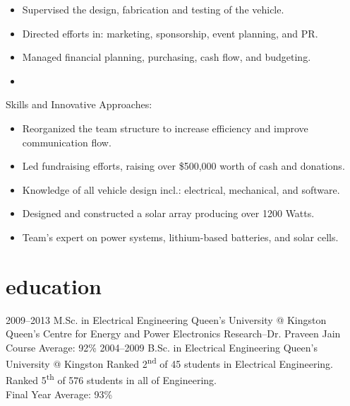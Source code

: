\documentclass[]{cv-style}          %
\begin{document}
\begin{entrylist}
{\begin{itemize}
    \item Supervised the design, fabrication and testing of the vehicle.
    \item Directed efforts in: marketing, sponsorship, event planning, and PR.
    \item Managed financial planning, purchasing, cash flow, and budgeting.
    \item
  \end{itemize}
  Skills and Innovative Approaches:
  \begin{itemize}
    \item Reorganized the team structure to increase efficiency and improve communication flow.
    \item Led fundraising efforts, raising over \$500,000 worth of cash and donations.
    \item Knowledge of all vehicle design incl.: electrical, mechanical, and software.
    \item Designed and constructed a solar array producing over 1200 Watts.
    \item Team’s expert on power systems, lithium-based batteries, and solar cells.
  \end{itemize}
}
\end{entrylist}


\section{education}

\begin{entrylist}
\entry
{2009--2013}
{M.Sc. {\normalfont in Electrical Engineering}}
{Queen's University @ Kingston}
{Queen’s Centre for Energy and Power Electronics Research--Dr. Praveen Jain\\
Course Average: 92\%}
{\vspace{-0.3cm}}
\entry
{2004--2009}
{B.Sc. {\normalfont in Electrical Engineering}}
{Queen's University @ Kingston}
{Ranked 2\textsuperscript{nd} of 45 students in Electrical Engineering.\\
Ranked 5\textsuperscript{th} of 576 students in all of Engineering.\\
Final Year Average: 93\%}
\end{entrylist}
\end{document}
